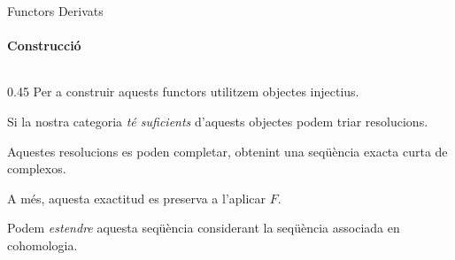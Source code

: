 \documentclass[notheorems, aspectratio=169]{beamer}
\begin{document}
\begin{frame}[fragile]{Functors Derivats}
  \framesubtitle{Construcció}
  \begin{columns}[T]
    \begin{column}{0.45\textwidth}
       {
        Per a construir aquests functors utilitzem \alert<1>{objectes injectius}.
      }

       {
        Si la nostra categoria \textit{té suficients} d'aquests objectes podem triar \alert<2>{resolucions}.
      }

       {
        Aquestes resolucions es poden completar, obtenint una \alert<3>{seqüència exacta curta de complexos}.
      }
      
       {
        A més, aquesta exactitud es \alert<4>{preserva} a l'aplicar \(F\).
      }

       {
        Podem \textit{estendre} aquesta seqüència considerant la seqüència associada en \alert<5>{cohomologia}.
      }


\end{column}
\end{columns}
\end{frame}
\end{document}
